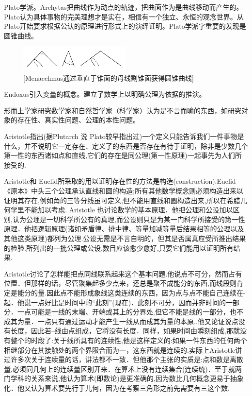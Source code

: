 Plato学派。Archytas把曲线作为动点的轨迹，把曲面作为是曲线移动而产生的。Plato认为具体事物的完美理想才是实在，相信有一个独立、永恒的观念世界。从Plato开始要求根据公认的原理进行形式上的演绎证明。Plato学派字重要的发现是圆锥曲线。

\begin{figure}[h]
    \centering
    \includegraphics[width=0.5\textwidth]{./resources/古今数学思想-图3_12.png}
    \caption{[Menaechmus通过垂直于锥面的母线割锥面获得圆锥曲线]}
    \label{fig:5}
\end{figure}

Endoxus引入变量的概念。建立了数学上以明确公理为依据的推演。

形而上学家研究数学家和自然哲学家（科学家）认为是不言而喻的东西，如研究对象的存在性、真实性问题、公理的本性问题。

Aristotle指出(据Plutarch 说 Plato较早指出过)一个定义只能告诉我们一件事物是什么，并不说明它一定存在．定义了的东西是否存在有待于证明，除非是少数几个第一性的东西诸如点和直线,它们的存在是同公理(第一性原理)一起事先为人们所接受的.

Aristotle和 Euelid所采取的用以证明存在性的方法是构造(construction).Euelid 《原本》中头三个公理承认直线和圆的构造;所有其他数学概念则必须构造出来以证明其存在,例如角的三等分线虽可定义,但不能用直线和圆构造出来,所以在希腊几何学里不能加以考虑.
Aristotle 也讨论数学的基本原理．他把公理和公设加以区别,认为公理是一切科学所公有的真理,而公设则只是为某一门科学所接受的第一性原理．他把逻辑原理(诸如矛盾律、排中律、等量加减等量后结果相等的公理以及其他这类原理)都列为公理.公设无需是不言自明的，但其是否属真应受所推出结果的检验.所列出的一批公理或公设,数目应该愈少愈好,只要它们能用以证明所有结果.

Aristotle讨论了怎样能把点同线联系起来这个基本问题.他说点不可分，然而占有位置．但那样的话，尽管聚集起多少点来，还总是聚不成能分的东西,而线段则肯定是能分的量.因此点不能形成象线这类连续的东西，因为点与点不能自己连续在-起．他说一点好比是时间中的“此刻”(现在)．此刻不可分，因而并非时间的一部分．一点可能是一线的末端、开端或其上的分界处,但它不能是线的一部分，也不成其为量．一点只有通过运动才能产生一线从而成其为量的本原..他又论证说点没有长度，因此若--线由点组成，它将没有长度．同样，如果时间由瞬刻组成,那就没有整个的时段了:关于线所具有的连续性,他是这样定义的:如果一件东西的任何两个相继部分在其接触处的两个界限合而为一，这东西就是连续的.实际上Aristotle讲过许多次关于连续量的话，讲法都不一致．但他那个主张的实质是:点和数是离散量,必须同几何上的连续量区别开来．在算术上没有连续集合(连续统)．至于就两门学科的关系来说,他认为算术(即数论)是更准确的,因为数比几何概念更易于抽象化．他又认为算术要先行于儿何，因为在考察三角形之前先需要有三这个数.

